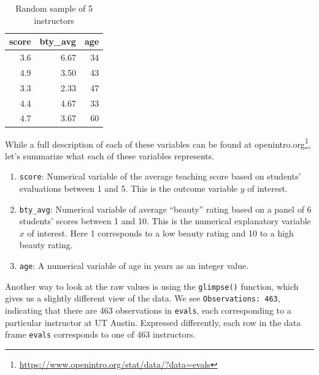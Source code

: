 \documentclass[12pt, krantz2,]{krantz}
\makeatletter
\newenvironment{Shaded}{\begin{snugshade}}{\end{snugshade}}
\newcommand{\DecValTok}[1]{\textcolor[rgb]{0.06,0.06,0.06}{#1}}
\newcommand{\KeywordTok}[1]{\textcolor[rgb]{0.27,0.27,0.27}{\textbf{#1}}}
\newcommand{\NormalTok}[1]{#1}
\newcommand{\OperatorTok}[1]{\textcolor[rgb]{0.43,0.43,0.43}{\textbf{#1}}}
\newcommand{\StringTok}[1]{\textcolor[rgb]{0.5,0.5,0.5}{#1}}
\providecommand{\tightlist}{%
  \setlength{\itemsep}{0pt}\setlength{\parskip}{0pt}}
\renewcommand{\href}[2]{#2\footnote{\url{#1}}}
\newenvironment{kframe}{%
\medskip{}
\setlength{\fboxsep}{.8em}
 \def\at@end@of@kframe{}%
 \ifinner\ifhmode%
  \def\at@end@of@kframe{\end{minipage}}%
  \begin{minipage}{\columnwidth}%
 \fi\fi%
 \def\FrameCommand##1{\hskip\@totalleftmargin \hskip-\fboxsep
 \colorbox{shadecolor}{##1}\hskip-\fboxsep
     \hskip-\linewidth \hskip-\@totalleftmargin \hskip\columnwidth}%
 \MakeFramed {\advance\hsize-\width
   \@totalleftmargin\z@ \linewidth\hsize
   \@setminipage}}%
 {\par\unskip\endMakeFramed%
 \at@end@of@kframe}
\renewenvironment{Shaded}{\begin{kframe}}{\end{kframe}}
\makeatother
\begin{document}
\begin{Shaded}
\end{Shaded}

\begin{table}[H]

\caption{\label{tab:unnamed-chunk-148}Random sample of 5 instructors}
\centering
\fontsize{10}{12}\selectfont
\begin{tabular}{rrr}
\toprule
score & bty\_avg & age\\
\midrule
3.6 & 6.67 & 34\\
4.9 & 3.50 & 43\\
3.3 & 2.33 & 47\\
4.4 & 4.67 & 33\\
4.7 & 3.67 & 60\\
\bottomrule
\end{tabular}
\end{table}

While a full description of each of these variables can be found at \href{https://www.openintro.org/stat/data/?data=evals}{openintro.org}, let's summarize what each of these variables represents.

\begin{enumerate}
\def\labelenumi{\arabic{enumi}.}
\tightlist
\item
  \texttt{score}: Numerical variable of the average teaching score based on students' evaluations between 1 and 5. This is the outcome variable \(y\) of interest.
\item
  \texttt{bty\_avg}: Numerical variable of average ``beauty'' rating based on a panel of 6 students' scores between 1 and 10. This is the numerical explanatory variable \(x\) of interest. Here 1 corresponds to a low beauty rating and 10 to a high beauty rating.
\item
  \texttt{age}: A numerical variable of age in years as an integer value.
\end{enumerate}

Another way to look at the raw values is using the \texttt{glimpse()} function, which gives us a slightly different view of the data. We see \texttt{Observations:\ 463}, indicating that there are 463 observations in \texttt{evals}, each corresponding to a particular instructor at UT Austin. Expressed differently, each row in the data frame \texttt{evals} corresponds to one of 463 instructors.
\end{document}
